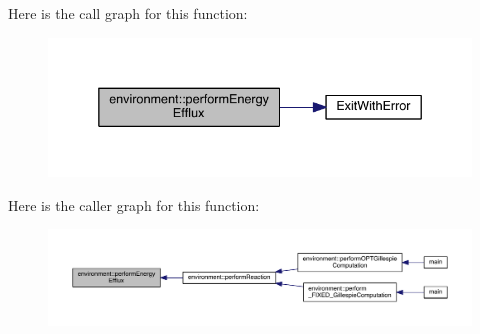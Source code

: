 Here is the call graph for this function\-:
\nopagebreak
\begin{figure}[H]
\begin{center}
\leavevmode
\includegraphics[width=336pt]{a00014_aff7607e0f3a74790109a7d87de3031bd_cgraph}
\end{center}
\end{figure}




Here is the caller graph for this function\-:
\nopagebreak
\begin{figure}[H]
\begin{center}
\leavevmode
\includegraphics[width=350pt]{a00014_aff7607e0f3a74790109a7d87de3031bd_icgraph}
\end{center}
\end{figure}


